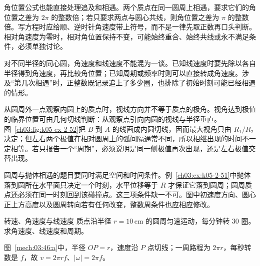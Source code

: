{角位置公式也能直接处理追及和相遇。两个质点在同一圆周上相遇，要求它们的角位置之差为 $2\pi$ 的整数倍；若只要求两点与圆心共线，则角位置之差为 $\pi$ 的整数倍。写方程时应给顺、逆时针角速度带上符号，而不是一律先取正数再口头判断。相对角速度为零时，相对角位置保持不变，可能始终重合、始终共线或永不满足条件，必须单独讨论。

对不同半径的同心圆，角速度和线速度不能混为一谈。已知线速度时要先除以各自半径得到角速度，再比较角位置；已知周期或频率时则可以直接转成角速度。涉及“第几次相遇”时，正整数既记录追上了多少圈，也排除了初始时刻可能已经相遇的情形。

从圆周外一点观察内圆上的质点时，视线方向并不等于质点的极角。视角达到极值的临界位置可由几何切线判断：从观察点引向内圆的视线与半径垂直。图~\ref{ch03:fig:k05-ex-2-52}把 $B$ 到 $A$ 的线画成内圆切线，因而最大视角只由 $R_1/R_2$ 决定；但左右两个极值在相对圆周上的弧间隔通常不同，所以相继出现的时间不一定相等。若只报告一个“周期”，必须说明是同一侧极值再次出现，还是左右极值交替出现。

圆周与抛体相遇的题目要同时满足空间和时间条件。例~\ref{ch03:ex:k05-2-51}中抛体落到圆所在水平面只决定一个时刻，水平位移等于 $R$ 才保证它落到圆周；圆周质点还必须在同一时刻回到该碰撞点。这三项条件缺一不可。图中初速度方向、圆心正上方高度以及圆周转向若有任何改变，整数周条件也应相应修改。

\begin{origexamplebox}{转速、角速度与线速度}\label{ch03:ex:k05-2-46}
质点沿半径 $r=10\,\mathrm{cm}$ 的圆周匀速运动，每分钟转 $30$ 圈。求角速度、线速度和周期。

\begin{qualityfigure}
\label{mech:03:46:q}
\end{qualityfigure}
\end{origexamplebox}
\begin{xesolution}
\begin{qualityfigure}
\label{mech:03:46:a}
\end{qualityfigure}
图~\ref{mech:03:46:a}中，半径 $OP=r$，速度沿 $P$ 点切线；一周路程为 $2\pi r$，每秒转数是 $f$，故 $v=2\pi rf$、$|\omega|=2\pi f$。


\end{xesolution}}
